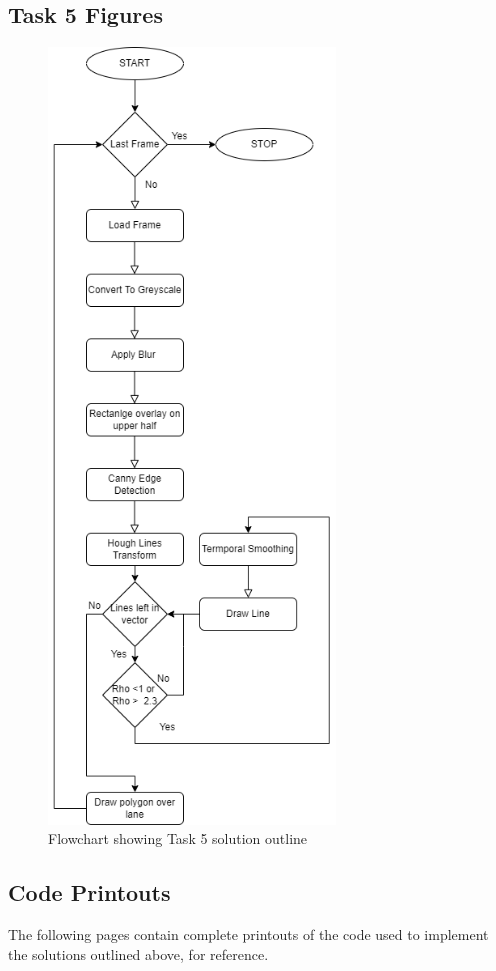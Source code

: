 \documentclass[conference]{IEEEtran}
\begin{document}
\subsection{Task 5 Figures}\label{app:T5}
\begin{figure}[H]
\centering
\includegraphics[width=3in]{Task5.drawio}
\caption{Flowchart showing Task 5 solution outline}
\label{fig:flowchart5}
\end{figure}
\subsection{Code Printouts}
The following pages contain complete printouts of the code used to implement the solutions outlined above, for reference.


%
%
\end{document}
